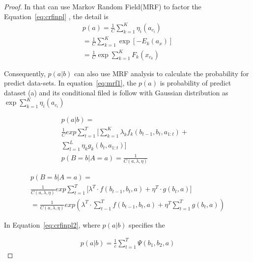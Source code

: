 \documentclass[journal,transmag]{IEEEtran}
\begin{document}
\begin{proof}




In that can use Markov Random Field(MRF) to factor the Equation~\ref{eq:crfinpl} , the detail is
\begin{equation}\label{eq:mrf1}
\begin{array}{ll}
      p(a)=  \frac{1}{C} \sum^K_{k=1} \eta_i (a_{c_{i}})    \\
      = \frac{1}{C} \sum^K_{k=1} \exp [-E_k (a_x)] \\
      = \frac{1}{C} \exp \sum^K_{k=1} F_k (x_{c_{k}})
\end{array}
\end{equation}

Consequently, $p(a|b)$ can also use MRF analysis to calculate the probability for predict data-sets. In equation~\ref{eq:mrf1}, the $p(a)$ is probability of predict dataset (a) and its conditional filed is follow with Gaussian distribution as $\exp \sum^K_{k=1} \eta_i (a_{c_{i}})$

\begin{equation}\label{eq:crfinpl2}
\begin{array}{ll}
      p(a|b)=  & \\
    \frac{1}{C} exp \sum^T_{t=1}  \lbrack  \sum^K_{k=1} \lambda_k f_k (b_{t-1},b_t,a_{1:t})+ &\\ \sum^L_{l=1} \eta_k g_k (b_t,a_{1:t}) \rbrack    \\
    p(B=b|A=a) = \frac{1}{C(a,\lambda,\eta)} 
\end{array}
\end{equation}

\begin{equation}\label{eq:crfinpl2a}
\begin{array}{ll}
    p(B=b|A=a) = \\
    \frac{1}{C(a,\lambda,\eta)}  exp \sum^T_{t=1} \lbrack \lambda^T \cdot f(b_{t-1},b_t,a) + \eta^T \cdot  g(b_t,a)  \rbrack \\
    = \frac{1}{C(a,\lambda,\eta)} exp (\lambda^T \cdot \sum^T_{t-1} f(b_{t-1},b_t,a) + \eta^T \sum^T_{t=1} g(b_t,a) )
\end{array}
\end{equation}

In Equation~\ref{eq:crfinpl2}, where $ p(a|b) $ specifies the 



\begin{equation}\label{eq:crfinpl2b}
\begin{array}{ll}
      p(a|b)=  \frac{1}{c} \sum^T_{t=1} \Psi  (b_1,b_2,a) 
\end{array}
\end{equation}


\end{proof}
\end{document}

